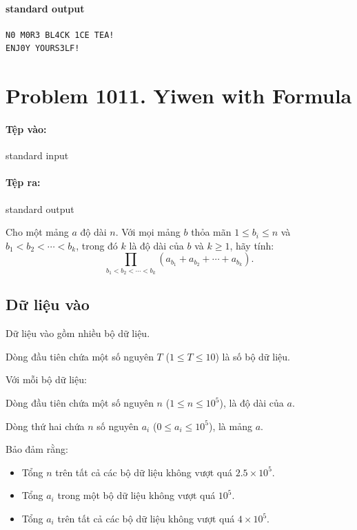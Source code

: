 \documentclass[11pt]{article}
\begin{document}
\paragraph{standard output}
\begin{verbatim}
N0 M0R3 BL4CK 1CE TEA!
ENJ0Y YOURS3LF!
\end{verbatim}

\section{Problem 1011. Yiwen with Formula}

\paragraph{Tệp vào:} standard input
\paragraph{Tệp ra:} standard output

Cho một mảng \(a\) độ dài \(n\). Với mọi mảng \(b\) thỏa mãn
\(1\le b_i\le n\) và \(b_1<b_2<\cdots<b_k\), trong đó \(k\) là độ dài của
\(b\) và \(k\ge 1\), hãy tính:
\[
  \prod_{b_1<b_2<\cdots<b_k}\left(a_{b_1}+a_{b_2}+\cdots+a_{b_k}\right).
\]

\subsection*{Dữ liệu vào}

Dữ liệu vào gồm nhiều bộ dữ liệu.

Dòng đầu tiên chứa một số nguyên \(T\) (\(1\le T\le 10\)) là số bộ dữ liệu.

Với mỗi bộ dữ liệu:

Dòng đầu tiên chứa một số nguyên \(n\) (\(1\le n\le 10^5\)), là độ dài của
\(a\).

Dòng thứ hai chứa \(n\) số nguyên \(a_i\) (\(0\le a_i\le 10^5\)), là mảng
\(a\).

Bảo đảm rằng:

\begin{itemize}
  \item Tổng \(n\) trên tất cả các bộ dữ liệu không vượt quá
  \(2.5\times 10^5\).
  \item Tổng \(a_i\) trong một bộ dữ liệu không vượt quá \(10^5\).
  \item Tổng \(a_i\) trên tất cả các bộ dữ liệu không vượt quá \(4\times 10^5\).
\end{itemize}
\end{document}
